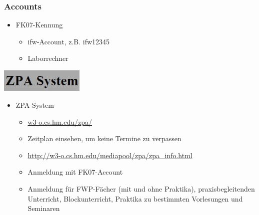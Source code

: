\documentclass{beamer}
\begin{document}
    \begin{frame}[t]
    	\frametitle{Accounts}
    	\begin{itemize}
    		\item FK07-Kennung
    		\begin{itemize}
    			\item ifw-Account, z.B. ifw12345
    			\item Laborrechner
    		\end{itemize}
    	\end{itemize}
    	\pause
    	\flushright
    	\includegraphics[width=0.3\textwidth]{zpa.jpg}
    	\begin{itemize}
    		\item ZPA-System
    		\begin{itemize}
    			\item \url{w3-o.cs.hm.edu/zpa/}
    			\item Zeitplan einsehen, um keine Termine zu verpassen
    			\item \footnotesize{\url{http://w3-o.cs.hm.edu/mediapool/zpa/zpa_info.html}}
    			\item \normalsize{Anmeldung mit FK07-Account}$  $
    			\item Anmeldung für FWP-Fächer (mit und ohne Praktika),
    			praxisbegleitenden Unterricht,
    			Blockunterricht,
    			Praktika zu bestimmten Vorlesungen und
    			Seminaren
    		\end{itemize}
    	\end{itemize}
    \end{frame}
    
\end{document}

